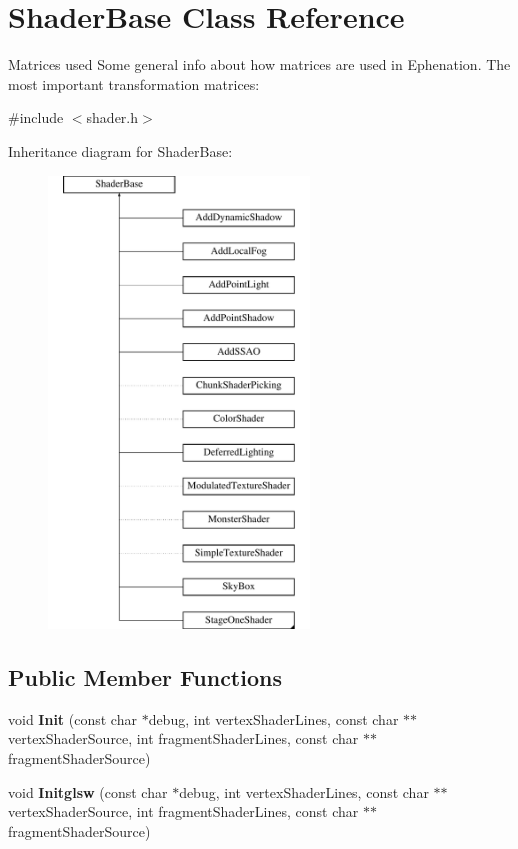 \hypertarget{classShaderBase}{\section{\-Shader\-Base \-Class \-Reference}
\label{classShaderBase}
}


\-Matrices used \-Some general info about how matrices are used in \-Ephenation. \-The most important transformation matrices\-:  




{\ttfamily \#include $<$shader.\-h$>$}

\-Inheritance diagram for \-Shader\-Base\-:\begin{figure}[H]
\begin{center}
\leavevmode
\includegraphics[height=12.000000cm]{classShaderBase}
\end{center}
\end{figure}
\subsection*{\-Public \-Member \-Functions}
\begin{DoxyCompactItemize}
\item 
\hypertarget{classShaderBase_a9dd2a538a1760b1b8744e2e0a8075d27}{void {\bfseries \-Init} (const char $\ast$debug, int vertex\-Shader\-Lines, const char $\ast$$\ast$vertex\-Shader\-Source, int fragment\-Shader\-Lines, const char $\ast$$\ast$fragment\-Shader\-Source)}\label{classShaderBase_a9dd2a538a1760b1b8744e2e0a8075d27}

\item 
\hypertarget{classShaderBase_a12ba43f4f4228bb1b759f53f9e0d9e38}{void {\bfseries \-Initglsw} (const char $\ast$debug, int vertex\-Shader\-Lines, const char $\ast$$\ast$vertex\-Shader\-Source, int fragment\-Shader\-Lines, const char $\ast$$\ast$fragment\-Shader\-Source)}\label{classShaderBase_a12ba43f4f4228bb1b759f53f9e0d9e38}

\end{DoxyCompactItemize}
